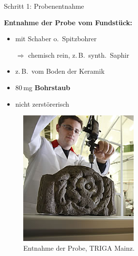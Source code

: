 \documentclass[xcolor=dvipsnames, aspectratio=169]{beamer}
\begin{document}
\begin{frame}{Schritt 1: Probenentnahme}
\begin{minipage}{0.56\textwidth}\flushleft
\textbf{Entnahme der Probe vom Fundstück:}\smallskip

\begin{itemize}
\item mit Schaber o.\ Spitzbohrer

$\Rightarrow$ chemisch rein, z.\,B.\ synth.\ Saphir
\item z.\,B.\ vom Boden der Keramik
\item 80\,mg \textbf{Bohrstaub}
\item \glqq nicht zerstörerisch\grqq
\end{itemize}
\end{minipage}\hfill
\begin{minipage}{0.4\textwidth}
\begin{figure}
\includegraphics[width=.8\textwidth]{img/drill.jpg}
\caption{Entnahme der Probe, TRIGA Mainz.}
\end{figure}
\end{minipage}
\end{frame}
\end{document}
